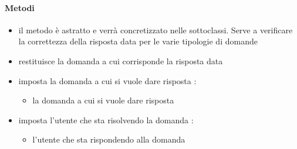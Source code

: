 \paragraph{Metodi}
\begin{itemize}
\item {}
\newline
il metodo è astratto e verrà concretizzato nelle sottoclassi. Serve a verificare la correttezza della risposta data per le varie tipologie di domande
\newline
\item {}
\newline
restituisce la domanda a cui corrisponde la risposta data
\newline
\item {}
\newline
imposta la domanda a cui si vuole dare risposta
\newline
{} :
\begin{itemize}
\item {}
\newline
la domanda a cui si vuole dare risposta
\end{itemize}
\item {}
\newline
imposta l'utente che sta risolvendo la domanda
\newline
{} :
\begin{itemize}
\item {}
\newline
l'utente che sta rispondendo alla domanda
\end{itemize}
\end{itemize}
